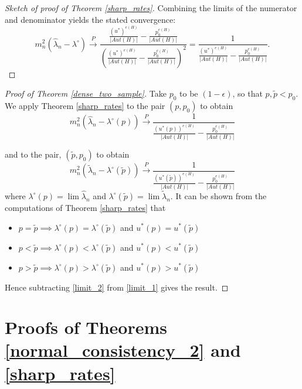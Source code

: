 \documentclass[12pt]{article}
\numberwithin{equation}{section}
\begin{document}
\begin{proof}[Sketch of proof of Theorem \ref{sharp_rates}]
Combining the limits of the numerator and denominator yields the stated convergence:
\begin{equation}
m_n^2(\hat{\lambda}_n - \lambda^{\circ}) \xrightarrow{P} \frac{\frac{(u^*)^{e(H)}}{|Aut(H)|} - \frac{p_0^{e(H)}}{|Aut(H)|}}{\left(\frac{(u^*)^{e(H)}}{|Aut(H)|} - \frac{p_0^{e(H)}}{|Aut(H)|}\right)^2} = \frac{1}{\frac{(u^*)^{e(H)}}{|Aut(H)|} - \frac{p_0^{e(H)}}{|Aut(H)|}}.\label{sharp_rates_statement}
\end{equation}

\end{proof}

\begin{proof}[Proof of Theorem \ref{dense_two_sample}]
    Take \(p_0\) to be \((1-\epsilon)\), so that \(p, \tilde{p} < p_0\).
We apply Theorem \ref{sharp_rates} to the pair \((p,p_0)\) to
obtain
\begin{equation}
\label{limit_1}
m_n^2(\hat{\lambda}_n-\lambda^{\circ}(p))\xrightarrow{P} \frac{1}{\frac{(u^*(p))^{e(H)}}{\lvert Aut(H)\rvert}-\frac{p_0^{e(H)}}{\lvert Aut(H)\rvert}}
\end{equation}

and to the pair, \((\tilde{p},p_0)\) to obtain
\begin{equation}
\label{limit_2}
m_n^2(\tilde{\lambda}_n-\lambda^{\circ}(\tilde{p}))\xrightarrow{P} \frac{1}{\frac{(u^*(\tilde{p}))^{e(H)}}{\lvert Aut(H)\rvert}-\frac{p_0^{e(H)}}{\lvert Aut(H)\rvert}}
\end{equation}
where \(\lambda^{\circ}(p) = \lim \hat{\lambda}_n\) and \(\lambda^{\circ}(\tilde{p})=\lim \tilde{\lambda}_n\). It can be shown from the computations of Theorem \ref{sharp_rates} that 
\begin{itemize}
\item \(p = \tilde{p} \implies \lambda^{\circ}(p) = \lambda^{\circ}(\tilde{p})\) and \(u^*(p) = u^*(\tilde{p})\) 
\item \(p < \tilde{p} \implies \lambda^{\circ}(p) < \lambda^{\circ}(\tilde{p})\) and \(u^*(p) < u^*(\tilde{p})\)
\item \(p > \tilde{p} \implies \lambda^{\circ}(p) > \lambda^{\circ}(\tilde{p})\) and \(u^*({p}) > u^*({\tilde{p}})\)
\end{itemize}

Hence subtracting \eqref{limit_2} from \eqref{limit_1} gives the result.


\end{proof}


\section{Proofs of Theorems \ref{normal_consistency_2} and \ref{sharp_rates} \label{sec:3.8,3.10}}
\end{document}
